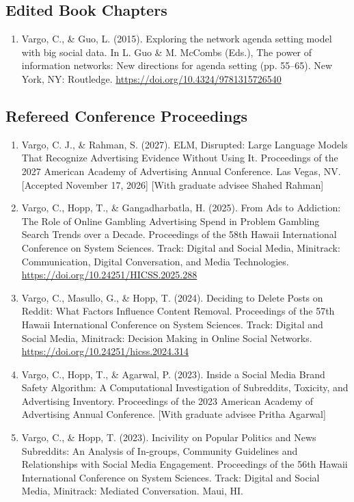 \documentclass[11pt,letterpaper]{article}
\begin{document}
\subsection*{Edited Book Chapters}
{\small
\begin{enumerate}
\item Vargo, C., \& Guo, L. (2015). Exploring the network agenda setting model with big social data. In L. Guo \& M. McCombs (Eds.), The power of information networks: New directions for agenda setting (pp. 55--65). New York, NY: Routledge. \url{https://doi.org/10.4324/9781315726540}
\end{enumerate}
}
\subsection*{Refereed Conference Proceedings}
{\small
\begin{enumerate}
\item Vargo, C. J., \& Rahman, S. (2027). ELM, Disrupted: Large Language Models That Recognize Advertising Evidence Without Using It. Proceedings of the 2027 American Academy of Advertising Annual Conference. Las Vegas, NV. [Accepted November 17, 2026] [With graduate advisee Shahed Rahman]
\item Vargo, C., Hopp, T., \& Gangadharbatla, H. (2025). From Ads to Addiction: The Role of Online Gambling Advertising Spend in Problem Gambling Search Trends over a Decade. Proceedings of the 58th Hawaii International Conference on System Sciences. Track: Digital and Social Media, Minitrack: Communication, Digital Conversation, and Media Technologies. \url{https://doi.org/10.24251/HICSS.2025.288}
\item Vargo, C., Masullo, G., \& Hopp, T. (2024). Deciding to Delete Posts on Reddit: What Factors Influence Content Removal. Proceedings of the 57th Hawaii International Conference on System Sciences. Track: Digital and Social Media, Minitrack: Decision Making in Online Social Networks. \url{https://doi.org/10.24251/hicss.2024.314}
\item Vargo, C., Hopp, T., \& Agarwal, P. (2023). Inside a Social Media Brand Safety Algorithm: A Computational Investigation of Subreddits, Toxicity, and Advertising Inventory. Proceedings of the 2023 American Academy of Advertising Annual Conference. [With graduate advisee Pritha Agarwal]
\item Vargo, C., \& Hopp, T. (2023). Incivility on Popular Politics and News Subreddits: An Analysis of In-groups, Community Guidelines and Relationships with Social Media Engagement. Proceedings of the 56th Hawaii International Conference on System Sciences. Track: Digital and Social Media, Minitrack: Mediated Conversation. Maui, HI.

\end{enumerate}}
\end{document}
